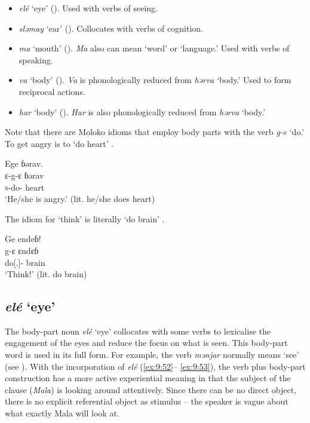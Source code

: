 \begin{itemize}
\item \textit{elé} ‘eye’ (). Used with verbs of seeing. 
\item \textit{sləmay} ‘ear’ (). Collocates with verbs of cognition. 
\item \textit{ma} ‘mouth’ (). \textit{Ma} also can mean ‘word’ or ‘language.’ Used with verbs of speaking. 
\item \textit{va} ‘body’ (). \textit{Va} is phonologically reduced from \textit{hərva} ‘body.’ Used to form reciprocal actions. 
\item \textit{har} ‘body’ (). \textit{Har} is also phonologically reduced from \textit{hərva} ‘body.’ 
\end{itemize}

Note that there are Moloko idioms that employ body parts with the verb \textit{g-e} ‘do.' To get angry is to ‘do heart’ . 

\ea \label{ex:9:50}
Ege  ɓərav.\\
\gll  ɛ{}-g-ɛ   ɓərav\\
      \textsc{s}-do-{\CL}  heart\\
\glt  ‘He/she is angry.’ (lit. he/she does heart)
\z

The idiom for ‘think’ is literally ‘do brain’ . 

\ea \label{ex:9:51}
Ge  endeɓ!\\
\gll  g-ɛ       ɛndɛɓ\\
      do[{\twoS}.{\IMP}]-{\CL}  brain\\
\glt  ‘Think!’ (lit. do brain)
\z

\subsection{\textit{elé}  ‘eye’}\label{sec:9.3.1}\label{sec:9.3.1.1}

The body-part noun \textit{elé}  ‘eye’ collocates with some verbs to lexicalise the engagement of the eyes and reduce the focus on what is seen.  This body-part word is used in its full form. For example, the verb \textit{mənjar} normally means ‘see’ (see ). With the incorporation of \textit{elé} (\ref{ex:9:52}-- \ref{ex:9:53}), the verb plus body-part construction has a more active experiential meaning in that the subject of the clause (\textit{Mala}) is looking around attentively. Since there can be no direct object, there is no explicit referential object as stimulus -- the speaker is vague about what exactly Mala will look at. 

